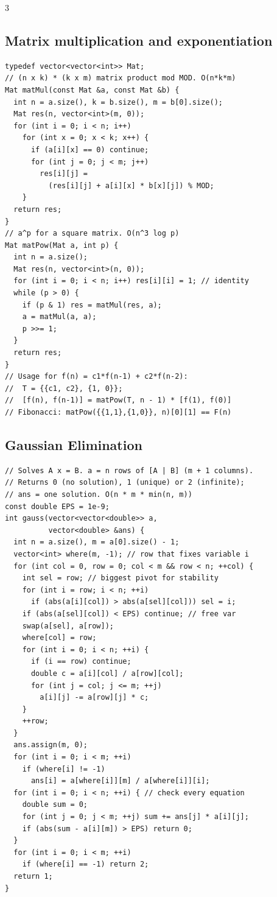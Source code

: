 \documentclass[8pt, a4paper]{article}
\begin{document}
\begin{multicols*}{3}
\subsection{Matrix multiplication and exponentiation}
\begin{lstlisting}
typedef vector<vector<int>> Mat;
// (n x k) * (k x m) matrix product mod MOD. O(n*k*m)
Mat matMul(const Mat &a, const Mat &b) {
  int n = a.size(), k = b.size(), m = b[0].size();
  Mat res(n, vector<int>(m, 0));
  for (int i = 0; i < n; i++)
    for (int x = 0; x < k; x++) {
      if (a[i][x] == 0) continue;
      for (int j = 0; j < m; j++)
        res[i][j] =
          (res[i][j] + a[i][x] * b[x][j]) % MOD;
    }
  return res;
}
// a^p for a square matrix. O(n^3 log p)
Mat matPow(Mat a, int p) {
  int n = a.size();
  Mat res(n, vector<int>(n, 0));
  for (int i = 0; i < n; i++) res[i][i] = 1; // identity
  while (p > 0) {
    if (p & 1) res = matMul(res, a);
    a = matMul(a, a);
    p >>= 1;
  }
  return res;
}
// Usage for f(n) = c1*f(n-1) + c2*f(n-2):
//  T = {{c1, c2}, {1, 0}};
//  [f(n), f(n-1)] = matPow(T, n - 1) * [f(1), f(0)]
// Fibonacci: matPow({{1,1},{1,0}}, n)[0][1] == F(n)
\end{lstlisting}
\subsection{Gaussian Elimination}
\begin{lstlisting}
// Solves A x = B. a = n rows of [A | B] (m + 1 columns).
// Returns 0 (no solution), 1 (unique) or 2 (infinite);
// ans = one solution. O(n * m * min(n, m))
const double EPS = 1e-9;
int gauss(vector<vector<double>> a,
          vector<double> &ans) {
  int n = a.size(), m = a[0].size() - 1;
  vector<int> where(m, -1); // row that fixes variable i
  for (int col = 0, row = 0; col < m && row < n; ++col) {
    int sel = row; // biggest pivot for stability
    for (int i = row; i < n; ++i)
      if (abs(a[i][col]) > abs(a[sel][col])) sel = i;
    if (abs(a[sel][col]) < EPS) continue; // free var
    swap(a[sel], a[row]);
    where[col] = row;
    for (int i = 0; i < n; ++i) {
      if (i == row) continue;
      double c = a[i][col] / a[row][col];
      for (int j = col; j <= m; ++j)
        a[i][j] -= a[row][j] * c;
    }
    ++row;
  }
  ans.assign(m, 0);
  for (int i = 0; i < m; ++i)
    if (where[i] != -1)
      ans[i] = a[where[i]][m] / a[where[i]][i];
  for (int i = 0; i < n; ++i) { // check every equation
    double sum = 0;
    for (int j = 0; j < m; ++j) sum += ans[j] * a[i][j];
    if (abs(sum - a[i][m]) > EPS) return 0;
  }
  for (int i = 0; i < m; ++i)
    if (where[i] == -1) return 2;
  return 1;
}
\end{lstlisting}

\end{multicols*}
\end{document}
